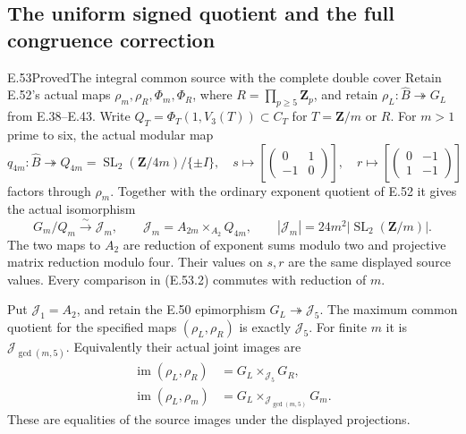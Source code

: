 \subsection{The uniform signed quotient and the full congruence correction}

\begin{statement}{E.53}{Proved}{The integral common source with the complete double cover}
Retain E.52's actual maps $\rho_m,\rho_R,\Phi_m,\Phi_R$,
where $R=\prod_{p\geq5}\mathbf Z_p$, and retain
$\rho_L:\widehat B\twoheadrightarrow G_L$ from E.38--E.43.
Write $Q_T=\Phi_T(1,V_3(T))\subset C_T$ for
$T=\mathbf Z/m$ or $R$.
For $m>1$ prime to six, the actual modular map
\[
 q_{4m}:\widehat B\twoheadrightarrow
       Q_{4m}=\operatorname{SL}_2(\mathbf Z/4m)/\{\pm I\},
 \quad
 s\longmapsto\left[\begin{pmatrix}0&1\\-1&0\end{pmatrix}\right],
 \quad
 r\longmapsto\left[\begin{pmatrix}0&-1\\1&-1\end{pmatrix}\right]
 \tag{E.53.1}
\]
factors through $\rho_m$. Together with the ordinary
exponent quotient of E.52 it gives the actual isomorphism
\[
 G_m/Q_m\xrightarrow{\sim}\mathcal J_m,
 \qquad
 \mathcal J_m=A_{2m}\mathbin{\times_{A_2}}Q_{4m},
 \qquad |\mathcal J_m|=24m^2|\operatorname{SL}_2(\mathbf Z/m)|.
 \tag{E.53.2}
\]
The two maps to $A_2$ are reduction of exponent sums
modulo two and projective matrix reduction modulo four.
Their values on $s,r$ are the same displayed source values.
Every comparison in \textup{(E.53.2)} commutes with
reduction of $m$.

Put $\mathcal J_1=A_2$, and retain the E.50 epimorphism
$G_L\twoheadrightarrow\mathcal J_5$.
The maximum common quotient for the specified maps
$(\rho_L,\rho_R)$ is exactly $\mathcal J_5$.
For finite $m$ it is $\mathcal J_{\gcd(m,5)}$.
Equivalently their actual joint images are
\[
 \begin{split}
 \operatorname{im}(\rho_L,\rho_R)
       &=G_L\mathbin{\times_{\mathcal J_5}}G_R,\\
 \operatorname{im}(\rho_L,\rho_m)
       &=G_L\mathbin{\times_{\mathcal J_{\gcd(m,5)}}}G_m.
 \end{split}
 \tag{E.53.3}
\]
These are equalities of the source images under the
displayed projections.


\end{statement}
